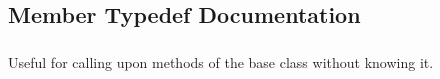 \subsection{Member Typedef Documentation}
\hypertarget{classHurricane_1_1Instance_a227e1f98670e466328ca95fe45546590}{
\subsubsection[{Inherit}]{}}\label{classHurricane_1_1Instance_a227e1f98670e466328ca95fe45546590}
Useful for calling upon methods of the base class without knowing it. 

